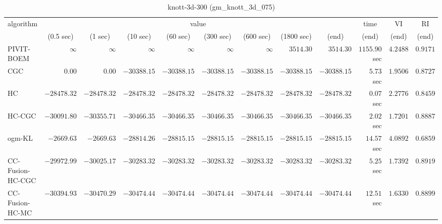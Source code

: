 \begin{table}[H]
\scriptsize
\centering
\caption{knott-3d-300 (gm\_knott\_3d\_075)}
\label{tab:anytimetable-knott-3d-300-gm-knott-3d-075}
\begin{tabular}{lrrrrrrrrrrr}
\toprule
           algorithm &                                   \multicolumn{8}{c}{value} & \multicolumn{1}{c}{time}    & \multicolumn{1}{c}{VI}  & \multicolumn{1}{c}{RI} \\  
\cmidrule(lr){2-9}\cmidrule(lr){10-10} \cmidrule(lr){11-11} \cmidrule(lr){12-12}   
                     & \multicolumn{1}{c}{(0.5 sec)} & \multicolumn{1}{c}{(1 sec)} & \multicolumn{1}{c}{(10 sec)} & \multicolumn{1}{c}{(60 sec)} & \multicolumn{1}{c}{(300 sec)} & \multicolumn{1}{c}{(600 sec)} & \multicolumn{1}{c}{(1800 sec)} & \multicolumn{1}{c}{(end)} & \multicolumn{1}{c}{(end)}    & \multicolumn{1}{c}{(end)}   & \multicolumn{1}{c}{(end)}  \\ \midrule 
          PIVIT-BOEM & $\infty$ & $\infty$ & $\infty$ & $\infty$ & $\infty$ & $\infty$ & $      3514.30$ & $      3514.30$ & $      1155.90$ sec    & $       4.2488$  & $       0.9171$ \\ 
                 CGC & $         0.00$ & $         0.00$ & $    -30388.15$ & $    -30388.15$ & $    -30388.15$ & $    -30388.15$ & $    -30388.15$ & $    -30388.15$ & $         5.73$ sec    & $       1.9506$  & $       0.8727$ \\ 
                  HC & $    -28478.32$ & $    -28478.32$ & $    -28478.32$ & $    -28478.32$ & $    -28478.32$ & $    -28478.32$ & $    -28478.32$ & $    -28478.32$ & $         0.07$ sec    & $       2.2776$  & $       0.8459$ \\ 
              HC-CGC & $    -30091.80$ & $    -30355.71$ & $    -30466.35$ & $    -30466.35$ & $    -30466.35$ & $    -30466.35$ & $    -30466.35$ & $    -30466.35$ & $         2.02$ sec    & $       1.7201$  & $       0.8887$ \\ 
              ogm-KL & $     -2669.63$ & $     -2669.63$ & $    -28814.26$ & $    -28815.15$ & $    -28815.15$ & $    -28815.15$ & $    -28815.15$ & $    -28815.15$ & $        14.57$ sec    & $       4.0892$  & $       0.6859$ \\ 
    CC-Fusion-HC-CGC & $    -29972.99$ & $    -30025.17$ & $    -30283.32$ & $    -30283.32$ & $    -30283.32$ & $    -30283.32$ & $    -30283.32$ & $    -30283.32$ & $         5.25$ sec    & $       1.7392$  & $       0.8919$ \\ 
     CC-Fusion-HC-MC & $    -30394.93$ & $    -30470.29$ & $    -30474.44$ & $    -30474.44$ & $    -30474.44$ & $    -30474.44$ & $    -30474.44$ & $    -30474.44$ & $        12.51$ sec    & $       1.6330$  & $       0.8899$ \\ 

\end{tabular}
\end{table}
